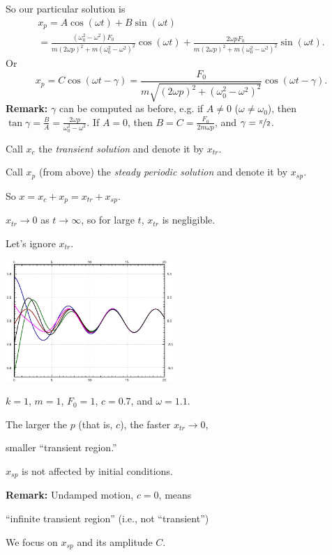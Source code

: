\documentclass[10pt,aspectratio=169]{beamer}
\begin{document}
\begin{frame}
So our particular solution is
\begin{multline*}
x_p = 
A \cos (\omega t) + B \sin (\omega t)
\\
=
\frac{(\omega_0^2-\omega^2) F_0}
{m{(2\omega p)}^2+m{(\omega_0^2-\omega^2)}^2} \cos (\omega t) +
\frac{2 \omega p F_0}
{m{(2\omega p)}^2+m{(\omega_0^2-\omega^2)}^2} \sin (\omega t) .
\end{multline*}
\pause
Or
\[
x_p = 
C \cos(\omega t - \gamma)
=
\frac{F_0}{m \sqrt{{(2\omega p)}^2+{(\omega_0^2-\omega^2)}^2}} 
\cos ( \omega t - \gamma ) .
\]
\pause
\textbf{Remark:}
$\gamma$ can be computed as before, e.g. if 
$A \not=0$ ($\omega \not= \omega_0$), then
$\tan \gamma = \frac{B}{A} = \frac{2\omega p}{\omega_0^2-\omega^2}$.
If $A=0$, then $B = C = \frac{F_0}{2m\omega p}$,
and $\gamma = \nicefrac{\pi}{2}$.
\end{frame}

\begin{frame}
Call $x_c$ the
\emph{transient solution}
and denote it by $x_{tr}$.

\medskip
\pause

Call $x_p$ (from above) the
\emph{steady periodic solution}
and denote it by $x_{sp}$.

\pause
\medskip

So
\quad
$x = x_c + x_p = x_{tr} + x_{sp}$.

\medskip
\pause

$x_{tr} \to 0$ as $t \to \infty$, so for large $t$, $x_{tr}$
is negligible.

Let's ignore $x_{tr}$.

\vspace*{-0.55in}

\hfill\includegraphics[width=2.5in]{../figures/3-6-transbeh}

\hfill $k=1$, $m=1$, $F_0 = 1$, $c=0.7$, and $\omega=1.1$.

\pause
\vspace*{-1.40in}

The larger the $p$ (that is, $c$), the
faster $x_{tr} \to 0$,

\thus
\quad 
smaller ``transient region.''

\medskip
\pause

$x_{sp}$ is not affected by initial conditions.

\medskip
\pause

\textbf{Remark:}
Undamped motion, $c=0$, means


``infinite transient region''
(i.e., not ``transient'')

\medskip
\pause

We focus on $x_{sp}$ and its amplitude $C$.

\end{frame}
\end{document}
